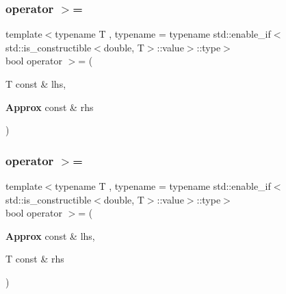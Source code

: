 \mbox{\label{class_catch_1_1_detail_1_1_approx_ae68a144dad95cfe31786d2df0b25bb02}} 
\subsubsection{operator $>$=\hspace{0.1cm}{\footnotesize\ttfamily [1/2]}}
{\footnotesize\ttfamily template$<$typename T , typename  = typename std\+::enable\+\_\+if$<$std\+::is\+\_\+constructible$<$double, T$>$\+::value$>$\+::type$>$ \\
bool operator $>$= (\begin{DoxyParamCaption}\item[{T const \&}]{lhs,  }\item[{\textbf{ Approx} const \&}]{rhs }\end{DoxyParamCaption})\hspace{0.3cm}{\ttfamily [friend]}}

\mbox{\label{class_catch_1_1_detail_1_1_approx_aef8dca60ba535199c0703e1e3a25562b}} 
\subsubsection{operator $>$=\hspace{0.1cm}{\footnotesize\ttfamily [2/2]}}
{\footnotesize\ttfamily template$<$typename T , typename  = typename std\+::enable\+\_\+if$<$std\+::is\+\_\+constructible$<$double, T$>$\+::value$>$\+::type$>$ \\
bool operator $>$= (\begin{DoxyParamCaption}\item[{\textbf{ Approx} const \&}]{lhs,  }\item[{T const \&}]{rhs }\end{DoxyParamCaption})\hspace{0.3cm}{\ttfamily [friend]}}

\mbox{\label{class_catch_1_1_detail_1_1_approx_a0369de03e81bc2ceaf6c9d830476bd49}} 

